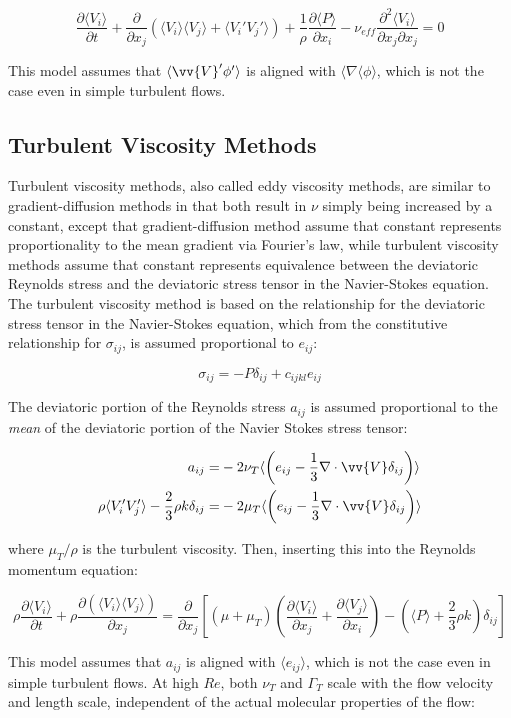 \documentclass[10pt]{article}
\newcommand{\beq}{\begin{equation}}
\newcommand{\eeq}{\end{equation}}
\newcommand{\beqa}{\begin{equation}\begin{aligned}}
\newcommand{\eeqa}{\end{aligned}\end{equation}}
\newcommand{\la}{\langle}
\newcommand{\ra}{\rangle}
\begin{document}
\begin{flushleft}
\beq
\frac{\partial \la V_i\ra}{\partial t}+\frac{\partial}{\partial x_j}\left(\la V_i\ra\la V_j\ra+\la V_i'V_j'\ra\right)+\frac{1}{\rho}\frac{\partial \la P\ra}{\partial x_i}-\nu_{eff}\frac{\partial^2 \la V_i\ra}{\partial x_j\partial x_j}=0
\eeq

This model assumes that \(\la \vv{V}'\phi'\ra\) is aligned with \(\la\nabla\la\phi\ra\), which is not the case even in simple turbulent flows. 


\subsection{Turbulent Viscosity Methods}
Turbulent viscosity methods, also called eddy viscosity methods, are similar to gradient-diffusion methods in that both result in \(\nu\) simply being increased by a constant, except that gradient-diffusion method assume that constant represents proportionality to the mean gradient via Fourier's law, while turbulent viscosity methods assume that constant represents equivalence between the deviatoric Reynolds stress and the deviatoric stress tensor in the Navier-Stokes equation. The turbulent viscosity method is based on the relationship for the deviatoric stress tensor in the Navier-Stokes equation, which from the constitutive relationship for \(\sigma_{ij}\), is assumed proportional to \(e_{ij}\):

\beq
\sigma_{ij}=-P\delta_{ij}+c_{ijkl}e_{ij}
\eeq

The deviatoric portion of the Reynolds stress \(a_{ij}\) is assumed proportional to the \textit{mean} of the deviatoric portion of the Navier Stokes stress tensor:

\beqa
a_{ij}=&-2\nu_T\la\left(e_{ij}-\frac{1}{3}\nabla\cdot\vv{V}\delta_{ij}\right)\ra\\
\rho\la V_i'V_j'\ra-\frac{2}{3}\rho k\delta_{ij}=&-2\mu_T\la\left(e_{ij}-\frac{1}{3}\nabla\cdot\vv{V}\delta_{ij}\right)\ra\\
\eeqa

where \(\mu_T/\rho\) is the turbulent viscosity. Then, inserting this into the Reynolds momentum equation:

\beq
\label{eq:turbvisc}
\rho\frac{\partial \la V_i\ra}{\partial t}+\rho\frac{\partial(\la V_i\ra\la V_j\ra)}{\partial x_j}=\frac{\partial}{\partial x_j}\left\lbrack(\mu+\mu_T)\left(\frac{\partial\la V_i\ra}{\partial x_j}+\frac{\partial\la V_j\ra}{\partial x_i}\right)-\left(\la P\ra+\frac{2}{3}\rho k\right)\delta_{ij}\right\rbrack
\eeq

This model assumes that \(a_{ij}\) is aligned with \(\la e_{ij}\ra\), which is not the case even in simple turbulent flows. At high \(Re\), both \(\nu_T\) and \(\Gamma_T\) scale with the flow velocity and length scale, independent of the actual molecular properties of the flow:


\end{flushleft}
\end{document}
